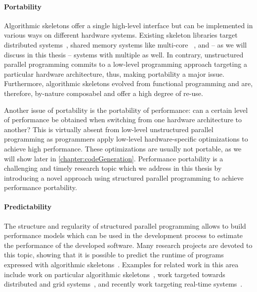 \paragraph{Portability}
Algorithmic skeletons offer a single high-level interface but can be implemented in various ways on different hardware systems.
Existing skeleton libraries target distributed systems~\cite{Kuchen02,AldinucciCDKT12,MatsuzakiKIHA04}, shared memory systems like multi-core \CPUs~\cite{AldinucciDaKiTo2011,CiechanowiczK10,LeytonP10}, and -- as we will discuss in this thesis -- systems with multiple \GPUs as well.
In contrary, unstructured parallel programming commits to a low-level programming approach targeting a particular hardware architecture, thus, making portability a major issue.
Furthermore, algorithmic skeletons evolved from functional programming and are, therefore, by-nature composabel and offer a high degree of re-use.

Another issue of portability is the portability of performance:
can a certain level of performance be obtained when switching from one hardware architecture to another?
This is virtually absent from low-level unstructured parallel programming as programmers apply low-level hardware-specific optimizations to achieve high performance.
These optimizations are usually not portable, as we will show later in \autoref{chapter:codeGeneration}.
Performance portability is a challenging and timely research topic which we address in this thesis by introducing a novel approach using structured parallel programming to achieve performance portability.

\pagebreak
\paragraph{Predictability}
The structure and regularity of structured parallel programming allows to build performance models which can be used in the development process to estimate the performance of the developed software.
Many research projects are devoted to this topic, showing that it is possible to predict the runtime of programs expressed with algorithmic skeletons~\cite{HayashiC02,DarlingtonFHKSW93,BischofGK03,Alt2007,StegmeierFrJAUn2015}.
Examples for related work in this area include work on particular algorithmic skeletons~\cite{BischofGK03}, work targeted towards distributed and grid systems~\cite{Alt2007}, and recently work targeting real-time systems~\cite{StegmeierFrJAUn2015}.

